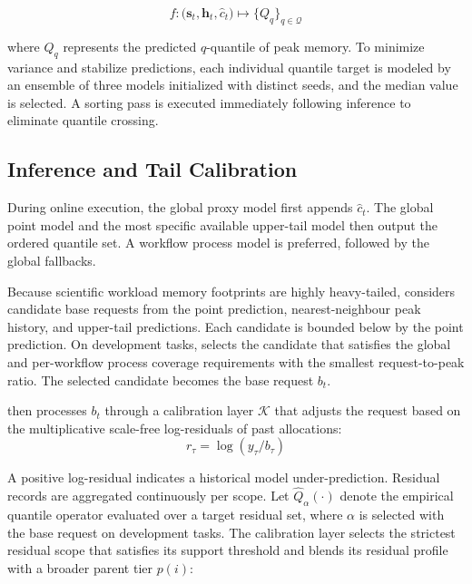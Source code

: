 \begin{equation} f : \big(\mathbf{s}_t, \mathbf{h}_t, \hat{c}_t\big) \longmapsto \{Q_q\}_{q \in \mathcal{Q}} \label{eq:qlgbm_mapping} \end{equation}

\noindent where $Q_q$ represents the predicted $q$-quantile of peak memory. To minimize variance and stabilize predictions, each individual quantile target is modeled by an ensemble of three models initialized with distinct seeds, and the median value is selected. A sorting pass is executed immediately following inference to eliminate quantile crossing.

\subsection{Inference and Tail Calibration}
\label{sec:calibration}

During online execution, the global proxy model first appends $\hat{c}_t$. The global point model and the most specific available upper-tail model then output the ordered quantile set. A workflow process model is preferred, followed by the global fallbacks.

Because scientific workload memory footprints are highly heavy-tailed, \toolname{} considers candidate base requests from the point prediction, nearest-neighbour peak history, and upper-tail predictions. Each candidate is bounded below by the point prediction. On development tasks, \toolname{} selects the candidate that satisfies the global and per-workflow process coverage requirements with the smallest request-to-peak ratio. The selected candidate becomes the base request $b_t$.

\toolname{} then processes $b_t$ through a calibration layer $\mathcal{K}$ that adjusts the request based on the multiplicative scale-free log-residuals of past allocations:
\begin{equation} r_\tau = \log(y_\tau / b_\tau) \label{eq:log_residual} \end{equation}

A positive log-residual indicates a historical model under-prediction. Residual records are aggregated continuously per scope. Let $\widehat{Q}_{\alpha}(\cdot)$ denote the empirical quantile operator evaluated over a target residual set, where $\alpha$ is selected with the base request on development tasks. The calibration layer selects the strictest residual scope that satisfies its support threshold and blends its residual profile with a broader parent tier $p(i)$:

